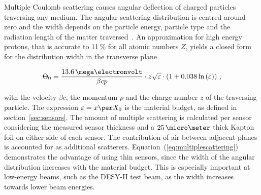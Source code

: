 % 
%
%
%
%
%
Multiple Coulomb scattering causes angular deflection of charged particles traversing any medium.
The angular scattering distribution is centred around zero
 and the width depends on the particle energy, particle type and the radiation length of the matter traversed~\cite{ref:scatteringhighland}.
An approximation for high energy protons, that is accurate to 11\,\% for all atomic numbers $Z$, yields a closed form for the distribution width in the transverse plane~\cite{ref:PDG-2014}

\begin{equation}
\label{eq:multiplescattering}
\Theta_{0} = \frac{13.6\,\mega\electronvolt}{\beta c p} \cdot z
\sqrt{\varepsilon}
\cdot \left( 1 + 0.038 \ln{\left( \varepsilon \right) } \right) \,,
\end{equation}

\noindent with the velocity $\beta c$, the momentum $p$ and the charge number $z$ of the traversing particle. 
The expression $\varepsilon = x \per X_0$ is the material budget, as defined in section~\ref{sec:sensors}.
The amount of multiple scattering is calculated per sensor considering the measured sensor thickness and a $25\,\micro\meter$ thick Kapton foil on either side of each sensor.
The contribution of air between adjacent planes is accounted for as additional scatterers. 
Equation~(\ref{eq:multiplescattering}) demonstrates the advantage of using thin sensors, since the width of the angular distribution increases with the material budget.
This is especially important at low-energy beams, such as the DESY-II test beam, as the width increases towards lower beam energies.

